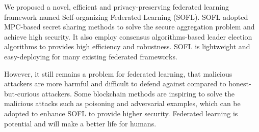 We proposed a novel, efficient and privacy-preserving federated learning framework named Self-organizing Federated Learning (SOFL). SOFL adopted MPC-based secret sharing methods to solve the secure aggregation problem and achieve high security. It also employ consensus algorithms-based leader election algorithms to provides high efficiency and robustness. SOFL is lightweight and easy-deploying for many existing federated frameworks.

However, it still remains a problem for federated learning, that malicious attackers are more harmful and difficult to defend against compared to honest-but-curious attackers. Some blockchain methods are inspiring to solve the malicious attacks such as poisoning and adversarial examples, which can be adopted to enhance SOFL to provide higher security. Federated learning is potential and will make a better life for humans.
